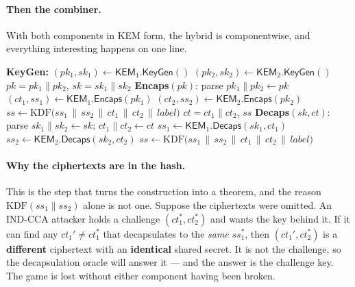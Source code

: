 \paragraph{Then the combiner.}
With both components in KEM form, the hybrid is componentwise, and everything
interesting happens on one line.

\begin{algorithm}[H]
\caption{Generic hybrid KEM from a classical $\mathsf{KEM}_1$ and a post-quantum $\mathsf{KEM}_2$}
\label{alg:hybrid-kem}
\begin{algorithmic}[1]
\Statex \textbf{KeyGen:}
\State $(pk_1, sk_1) \gets \mathsf{KEM}_1.\mathsf{KeyGen}()$
\State $(pk_2, sk_2) \gets \mathsf{KEM}_2.\mathsf{KeyGen}()$
\State \Return $pk = pk_1 \| pk_2$, \quad $sk = sk_1 \| sk_2$
\Statex \textbf{Encaps}$(pk)$:
\State parse $pk_1 \| pk_2 \gets pk$
\State $(ct_1, ss_1) \gets \mathsf{KEM}_1.\mathsf{Encaps}(pk_1)$
\State $(ct_2, ss_2) \gets \mathsf{KEM}_2.\mathsf{Encaps}(pk_2)$
\State $ss \gets \mathrm{KDF}\big(ss_1 \,\|\, ss_2 \,\|\, ct_1 \,\|\, ct_2 \,\|\, \textit{label}\big)$
\State \Return $ct = ct_1 \| ct_2$, \quad $ss$
\Statex \textbf{Decaps}$(sk, ct)$:
\State parse $sk_1 \| sk_2 \gets sk$; \quad $ct_1 \| ct_2 \gets ct$
\State $ss_1 \gets \mathsf{KEM}_1.\mathsf{Decaps}(sk_1, ct_1)$
\State $ss_2 \gets \mathsf{KEM}_2.\mathsf{Decaps}(sk_2, ct_2)$
\State \Return $ss \gets \mathrm{KDF}\big(ss_1 \,\|\, ss_2 \,\|\, ct_1 \,\|\, ct_2 \,\|\, \textit{label}\big)$
\end{algorithmic}
\end{algorithm}

\paragraph{Why the ciphertexts are in the hash.}
This is the step that turns the construction into a theorem, and the reason
$\mathrm{KDF}(ss_1 \| ss_2)$ alone is not one. Suppose the ciphertexts were
omitted. An IND-CCA attacker holds a challenge $(ct_1^{*}, ct_2^{*})$ and wants
the key behind it. If it can find any $ct_1' \neq ct_1^{*}$ that decapsulates to
the \emph{same} $ss_1^{*}$, then $(ct_1', ct_2^{*})$ is a \textbf{different}
ciphertext with an \textbf{identical} shared secret. It is not the challenge, so
the decapsulation oracle will answer it --- and the answer is the challenge key.
The game is lost without either component having been broken.

